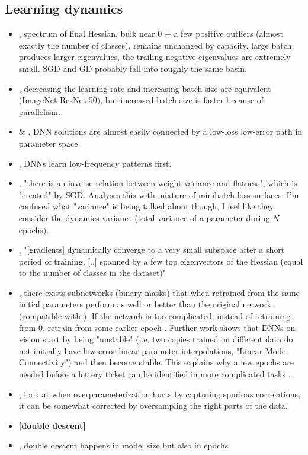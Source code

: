 \subsection{Learning dynamics}
\begin{itemize}
  \item \citet{sagun2017empirical}, spectrum of final Hessian, bulk near 0 + a few positive outliers (almost exactly the number of classes), remains unchanged by capacity, large batch produces larger eigenvalues, the trailing negative eigenvalues are extremely small. SGD and GD probably fall into roughly the same basin.
  \item \citet{smith2017dont}, decreasing the learning rate and increasing batch size are equivalent (ImageNet ResNet-50), but increased batch size is faster because of parallelism.
  \item \citet{draxler2018essentially} \& \citet{garipov2018LossSM}, DNN solutions are almost easily connected by a low-loss low-error path in parameter space.
  \item \citet{rahaman2018spectral}, DNNs learn low-frequency patterns first.
  \item \citet{feng2020neural}, "there is an inverse relation between weight variance and flatness", which is "created" by SGD. Analyses this with mixture of minibatch loss surfaces. I'm confused what "variance" is being talked about though, I feel like they consider the dynamics variance (total variance of a parameter during $N$ epochs).
  \item \citet{gur2018gradient}, "[gradients] dynamically converge to a very small subspace after a short period of training, [..] spanned by a few top eigenvectors of the Hessian (equal to the number of classes in the dataset)"
  \item \citet{frankle2018lottery}, there exists subnetworks (binary masks) that when retrained from the same initial parameters perform as well or better than the original network (compatible with \citet{gur2018gradient}). If the network is too complicated, instead of retraining from 0, retrain from some earlier epoch \citep{frankle2019lottery}. Further work shows that DNNs on vision start by being "unstable" (i.e. two copies trained on different data do not initially have low-error linear parameter interpolations, "Linear Mode Connectivity") and then become stable. This explains why a few epochs are needed before a lottery ticket can be identified in more complicated tasks \citep{frankle2019linear}.
  \item \citet{sagawa2020investigation}, look at when overparameterization hurts by capturing spurious correlations, it can be somewhat corrected by oversampling the right parts of the data.
  \item \textbf{[double descent]}
  \item \citet{nakkiran2019deep}, double descent happens in model size but also in epochs
  \end{itemize}

